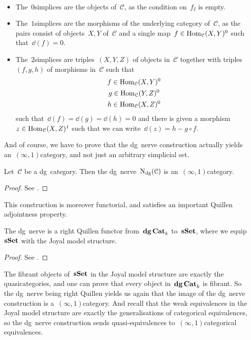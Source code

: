 \begin{refsection}
\begin{example} {\ }
\begin{itemize}
    \item The~$0$\dash simplices are the objects of~$\mathcal{C}$, as the condition on~$f_I$ is empty.
    \item The~$1$\dash simplices are the morphisms of the underlying category of~$\mathcal{C}$, as the pairs consist of objects~$X,Y$ of~$\mathcal{C}$ and a single map~$f\in\mathrm{Hom}_{\mathcal{C}}(X,Y)^0$ such that~$\dd(f)=0$.
    \item The~$2$\dash simplices are triples~$(X,Y,Z)$ of objects in~$\mathcal{C}$ together with triples~$(f,g,h)$ of morphisms in~$\mathcal{C}$ such that
      \begin{equation}
        \begin{gathered}
          f\in\mathrm{Hom}_{\mathcal{C}}(X,Y)^0 \\
          g\in\mathrm{Hom}_{\mathcal{C}}(Y,Z)^0 \\
          h\in\mathrm{Hom}_{\mathcal{C}}(X,Z)^0 \\
        \end{gathered}
      \end{equation}
      such that~$\dd(f)=\dd(g)=\dd(h)=0$ and there is given a morphism~$z\in\mathrm{Hom}_{\mathcal{C}}(X,Z)^1$ such that we can write~$\dd(z)=h-g\circ f$.
  \end{itemize}
\end{example}
And of course, we have to prove that the dg~nerve construction actually yields an~$(\infty,1)$\dash category, and not just an arbitrary simplicial set.
\begin{proposition}
  Let~$\mathcal{C}$ be a dg~category. Then the dg~nerve~$\operatorname{N}_{\mathrm{dg}}(\mathcal{C})$ is an~$(\infty,1)$\dash category.
  \begin{proof}
    See \cite[proposition 1.3.1.10]{ha}.
  \end{proof}
\end{proposition}
This construction is moreover functorial, and satisfies an important Quillen adjointness property.
\begin{proposition}
  The dg~nerve is a right Quillen functor from~$\mathbf{dg\,Cat}_k$ to~$\mathbf{s\,\!\mathbf{Set}}$, where we equip~$\mathbf{s\,\!\mathbf{Set}}$ with the Joyal model structure.
  \begin{proof}
    See \cite[proposition 1.3.1.20]{ha}.
  \end{proof}
\end{proposition}
The fibrant objects of~$\mathbf{s\,\!\mathbf{Set}}$ in the Joyal model structure are exactly the quasicategories, and one can prove that every object in~$\mathbf{dg\,Cat}_k$ is fibrant. So the dg~nerve being right Quillen yields us again that the image of the dg~nerve construction is a~$(\infty,1)$\dash category. And recall that the weak equivalences in the Joyal model structure are exactly the generalisations of categorical equivalences, so the dg~nerve construction sends quasi-equivalences to~$(\infty,1)$\dash categorical equivalences.

\printbibliography[heading = local]

\end{refsection}

